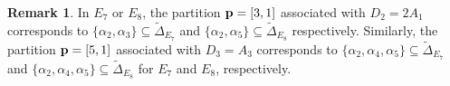 \documentclass[reqno,12pt]{amsart}
\numberwithin{equation}{section}
\theoremstyle{plain}
\theoremstyle{definition}
\newtheorem{Rem}[Thm]{Remark}
\newcommand{\ep}{\varepsilon}
\renewcommand{\subset}{\subseteq}
\begin{document}
  
  
  
  
 
 
   

\begin{Rem}
    In $E_7$ or $E_8$, the partition  ${\bf p}=[3,1]$ associated with $D_2=2A_1$ corresponds to $\{\alpha_2, \alpha_3\} \subset \tilde{\Delta}_{E_7}$ and $\{\alpha_2, \alpha_5\} \subset \tilde{\Delta}_{E_8}$ respectively. Similarly, the partition  ${\bf p}=[5,1]$ associated with $D_3 = A_3$ corresponds to $\{\alpha_2, \alpha_4,\alpha_5\}\subset \tilde{\Delta}_{E_7}$ and $\{\alpha_2, \alpha_4,\alpha_5\}\subset \tilde{\Delta}_{E_8}$ for $E_7$ and $E_8$, respectively. 
\end{Rem}
\end{document}
